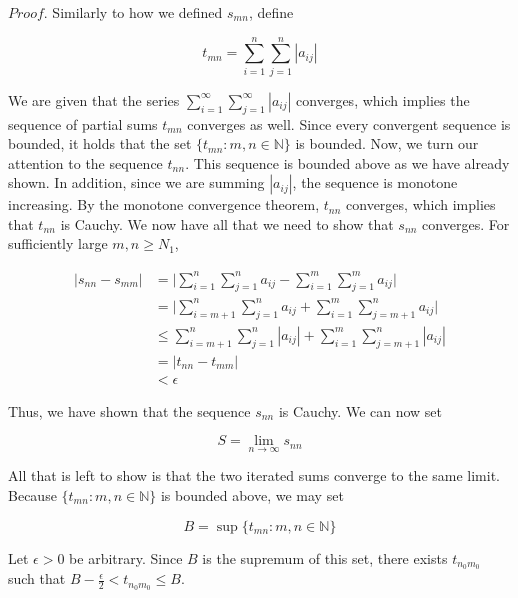 \documentclass{article}
\begin{document}
$Proof.$ Similarly to how we defined $s_{mn}$, define 

\begin{equation}
    t_{mn} = \sum_{i=1}^n \sum_{j=1}^n |a_{ij}|
\end{equation}

We are given that the series $\sum_{i=1}^\infty \sum_{j=1}^\infty |a_{ij}|$ converges, which implies the sequence of partial sums $t_{mn}$ converges as well. Since every convergent sequence is bounded, it holds that the set $\{t_{mn}: m, n \in \mathbb{N}\}$ is bounded. Now, we turn our attention to the sequence $t_{nn}$. This sequence is bounded above as we have already shown. In addition, since we are summing $|a_{ij}|$, the sequence is monotone increasing. By the monotone convergence theorem, $t_{nn}$ converges, which implies that $t_{nn}$ is Cauchy. We now have all that we need to show that $s_{nn}$ converges. For sufficiently large $m, n \geq N_1$,

\begin{equation}
\begin{split}
    |s_{nn} - s_{mm}| &= \Bigg| \sum_{i=1}^n \sum_{j=1}^n a_{ij} - \sum_{i=1}^m \sum_{j=1}^m a_{ij}\Bigg| \\[5 mm]
    &= \Bigg| \sum_{i=m+1}^n \sum_{j=1}^n a_{ij} + \sum_{i=1}^m\sum_{j=m+1}^n a_{ij}\Bigg| \\[5 mm]
    &\leq \sum_{i=m+1}^n \sum_{j=1}^n |a_{ij}| + \sum_{i=1}^m\sum_{j=m+1}^n |a_{ij}|\\[5 mm]
    &=|t_{nn} - t_{mm}|\\[5 mm]
    &< \epsilon
\end{split}
\end{equation}

Thus, we have shown that the sequence $s_{nn}$ is Cauchy. We can now set 

\begin{equation}
    S = \lim_{n \to \infty} s_{nn}
\end{equation}

All that is left to show is that the two iterated sums converge to the same limit. Because $\{t_{mn}: m, n \in \mathbb{N}\}$ is bounded above, we may set 

\begin{equation}
    B = \sup \{t_{mn}: m, n \in \mathbb{N}\}
\end{equation}

Let $\epsilon > 0$ be arbitrary. Since $B$ is the supremum of this set, there exists $t_{n_{0}m_0}$ such that $B - \frac{\epsilon}{2} < t_{n_{0}m_0} \leq B$.\\
\end{document}
